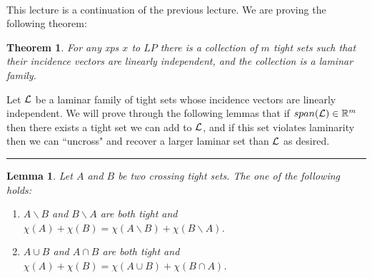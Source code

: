 \documentclass[letterpaper,12pt,oneside,onecolumn]{article}
\newenvironment{proof}{{\bf Proof:  }}{\hfill\rule{2mm}{2mm}}
\newtheorem{lemma}[fact]{Lemma}
\newtheorem{theorem}[fact]{Theorem}
\begin{document}
\paragraph{}
This lecture is a continuation of the previous lecture. We are proving the following theorem:
\begin{theorem}
For any xps $x$ to $LP$ there is a collection of $m$ tight sets such that their incidence vectors are linearly independent, and the collection is a laminar family.
\end{theorem}
\begin{proof}
Let $\mathcal{L}$ be a laminar family of tight sets whose incidence vectors are linearly independent. We will prove through the following lemmas that if $span(\mathcal{L}) \in \mathbb{R}^m$ then there exists a tight set we can add to $\mathcal{L}$, and if this set violates laminarity then we can ``uncross" and recover a larger laminar set than $\mathcal{L}$ as desired.
\end{proof}
\begin{lemma}
Let $A$ and $B$ be two crossing tight sets. The one of the following holds:
\begin{enumerate}
\item $A\backslash B$ and $B \backslash A$ are both tight and $\chi(A) + \chi(B) = \chi(A\backslash B) + \chi(B\backslash A)$.
\item $A\cup B$ and $A\cap B$ are both tight and $\chi(A) + \chi(B) = \chi(A\cup B) + \chi(B\cap A)$.
\end{enumerate}
\end{lemma}
\end{document}
